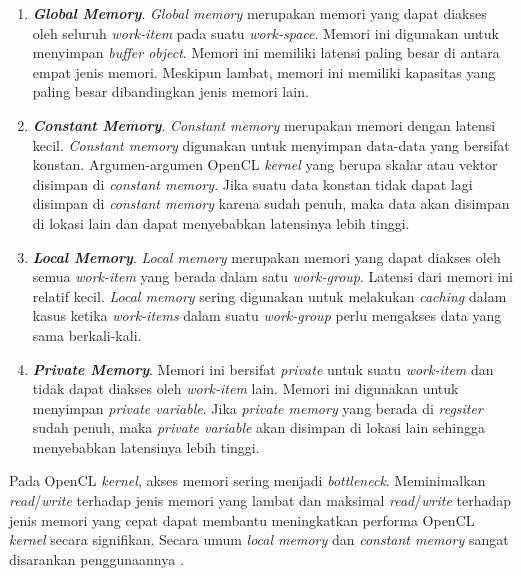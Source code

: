 \begin{enumerate}

\item \textbf{\textit{Global Memory}}. \textit{Global memory} merupakan memori yang dapat diakses oleh seluruh \textit{work-item} pada suatu \textit{work-space}. Memori ini digunakan untuk menyimpan \textit{buffer object}. Memori ini memiliki latensi paling besar di antara empat jenis memori. Meskipun lambat, memori ini memiliki kapasitas yang paling besar dibandingkan jenis memori lain.

\item \textbf{\textit{Constant Memory}}. \textit{Constant memory} merupakan memori dengan latensi kecil. \textit{Constant memory} digunakan untuk menyimpan data-data yang bersifat konstan. Argumen-argumen OpenCL \textit{kernel} yang berupa skalar atau vektor disimpan di \textit{constant memory}. Jika suatu data konstan tidak dapat lagi disimpan di \textit{constant memory} karena sudah penuh, maka data akan disimpan di lokasi lain dan dapat menyebabkan latensinya lebih tinggi.

\item \textbf{\textit{Local Memory}}. \textit{Local memory} merupakan memori yang dapat diakses oleh semua \textit{work-item} yang berada dalam satu \textit{work-group}. Latensi dari memori ini relatif kecil. \textit{Local memory} sering digunakan untuk melakukan \textit{caching} dalam kasus ketika \textit{work-items} dalam suatu \textit{work-group} perlu mengakses data yang sama berkali-kali.

\item \textbf{\textit{Private Memory}}. Memori ini bersifat \textit{private} untuk suatu \textit{work-item} dan tidak dapat diakses oleh \textit{work-item} lain. Memori ini digunakan untuk menyimpan \textit{private variable}. Jika \textit{private memory} yang berada di \textit{regsiter} sudah penuh, maka \textit{private variable} akan disimpan di lokasi lain sehingga menyebabkan latensinya lebih tinggi.  

\end{enumerate}

Pada OpenCL \textit{kernel}, akses memori sering menjadi \textit{bottleneck}. Meminimalkan \textit{read}/\textit{write} terhadap jenis memori yang lambat dan maksimal \textit{read}/\textit{write} terhadap jenis memori yang cepat dapat membantu meningkatkan performa OpenCL \textit{kernel} secara signifikan. Secara umum \textit{local memory} dan \textit{constant memory} sangat disarankan penggunaannya \cite{opencl}.

